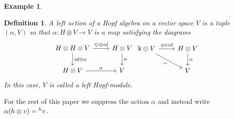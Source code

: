 \documentclass[12pt,a4paper]{article}
\newtheorem{example}[theorem]{Example}
\newtheorem{definition}[theorem]{Definition}
\newcommand{\kk}{\Bbbk}
\newcommand\1{_{(1)}}
\newcommand\2{_{(2)}}
\begin{document}
\begin{example}

\end{example}

\begin{definition} A left action of a Hopf algebra on a vector space $V$ is a tuple $(\alpha, V)$ so that
$\alpha:H\otimes V\to V$ is a map satisfying the diagrams
\[
\begin{tikzcd}
H\otimes H\otimes V \arrow[r, "\bigtriangledown\otimes id"] \arrow[d, "id\otimes \alpha"] & H\otimes V \arrow[d, "\alpha"] \\
H\otimes V \arrow[r, "\alpha"]                                                         & V                             
\end{tikzcd}
\begin{tikzcd}
\kk\otimes V \arrow[r, "\eta\otimes id"] \arrow[rd, "="'] & H\otimes V \arrow[d, "\alpha"] \\
                                                          & V                             
\end{tikzcd}
\]
In this case, $V$ is called a left Hopf-module.
\end{definition}

For the rest of this paper we suppress the action $\alpha$ and instead write $\alpha(h\otimes v)=\prescript{h}{}v$.
\end{document}

